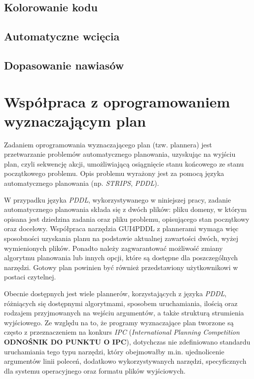 \subsection{Kolorowanie kodu}
\subsection{Automatyczne wcięcia}
\subsection{Dopasowanie nawiasów}
\section{Współpraca z oprogramowaniem wyznaczającym plan}
\label{sec:wspolpraca}
Zadaniem oprogramowania wyznaczającego plan (tzw. plannera) jest przetwarzanie problemów automatycznego planowania, uzyskując na wyjściu plan, czyli sekwencję akcji, umożliwiającą osiągnięcie stanu końcowego ze stanu początkowego problemu. Opis problemu wyrażony jest za pomocą języka automatycznego planowania (np. \textit{STRIPS}, \textit{PDDL}). 

W przypadku języka \textit{PDDL}, wykorzystywanego w niniejszej pracy, zadanie automatycznego planowania składa się z dwóch plików: pliku domeny, w którym opisana jest dziedzina zadania oraz pliku problemu, opisującego stan początkowy oraz docelowy. Współpraca narzędzia GUI4PDDL z plannerami wymaga więc sposobności uzyskania planu na podstawie aktualnej zawartości dwóch, wyżej wymienionych plików. Ponadto należy zagwarantować możliwość zmiany algorytmu planowania lub innych opcji, które są dostępne dla poszczególnych narzędzi. Gotowy plan powinien być również przedstawiony użytkownikowi w postaci czytelnej.

Obecnie dostępnych jest wiele plannerów, korzystających z języka \textit{PDDL}, różniących się dostępnymi algorytmami, sposobem uruchamiania, ilością oraz rodzajem przyjmowanych na wejściu argumentów, a także strukturą strumienia wyjściowego. Ze względu na to, że programy wyznaczające plan tworzone są często z przeznaczeniem na konkurs \textit{IPC} (\textit{International Planning Competition} \textbf{ODNOŚNIK DO PUNKTU O IPC}), dotychczas nie zdefiniowano standardu uruchamiania tego typu narzędzi, który obejmowałby m.in. ujednolicenie argumentów linii poleceń, dodatkowo wykorzystywanych narzędzi, specyficznych dla systemu operacyjnego oraz formatu plików wyjściowych.

